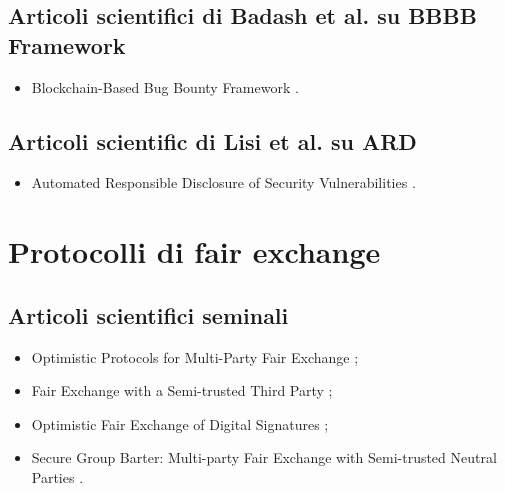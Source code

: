 \subsection*{Articoli scientifici di Badash et al. su BBBB Framework}
\begin{itemize}

\item Blockchain-Based Bug Bounty Framework \cite{badash2021blockbounty}.

\end{itemize}

\subsection*{Articoli scientific di Lisi et al. su ARD}
\begin{itemize}

\item Automated Responsible Disclosure of Security Vulnerabilities \cite{lisi2022ard}.

\end{itemize}

\section*{Protocolli di fair exchange}

\subsection*{Articoli scientifici seminali}
\begin{itemize}

\item Optimistic Protocols for Multi-Party Fair Exchange \cite{asokan1996fairexchange};

\item Fair Exchange with a Semi-trusted Third Party \cite{franklin1997fairexchange};

\item Optimistic Fair Exchange of Digital Signatures \cite{asokan1998fairexchange};

\item Secure Group Barter: Multi-party Fair Exchange with Semi-trusted Neutral Parties \cite{franklin1998fairexchange}.

\end{itemize}

